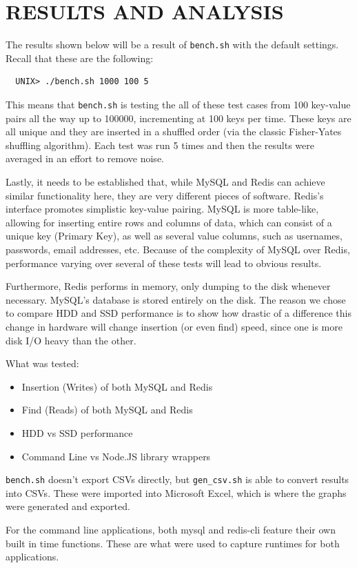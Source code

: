\documentclass[letterpaper, 10 pt, conference]{ieeeconf}
\begin{document}
\section{RESULTS AND ANALYSIS}
The results shown below will be a result of \texttt{bench.sh} with the default settings. Recall that these are the following:
\begin{verbatim}
  UNIX> ./bench.sh 1000 100 5  
\end{verbatim}
This means that \texttt{bench.sh} is testing the all of these test cases from 100 key-value pairs all the way up to 100000, incrementing at 100 keys per time. These keys are all unique and they are inserted in a shuffled order (via the classic Fisher-Yates shuffling algorithm). Each test was run 5 times and then the results were averaged in an effort to remove noise.


Lastly, it needs to be established that, while MySQL and Redis can achieve similar functionality here, they are very different pieces of software. Redis's interface promotes simplistic key-value pairing. MySQL is more table-like, allowing for inserting entire rows and columns of data, which can consist of a unique key (Primary Key), as well as several value columns, such as usernames, passwords, email addresses, etc. Because of the complexity of MySQL over Redis, performance varying over several of these tests will lead to obvious results.


Furthermore, Redis performs in memory, only dumping to the disk whenever necessary. MySQL's database is stored entirely on the disk. The reason we chose to compare HDD and SSD performance is to show how drastic of a difference this change in hardware will change insertion (or even find) speed, since one is more disk I/O heavy than the other.


What was tested:
\begin{itemize}
    \item Insertion (Writes) of both MySQL and Redis
    \item Find (Reads) of both MySQL and Redis
    \item HDD vs SSD performance
    \item Command Line vs Node.JS library wrappers
\end{itemize}
\texttt{bench.sh} doesn't export CSVs directly, but \texttt{gen\_csv.sh} is able to convert results into CSVs. These were imported into Microsoft Excel, which is where the graphs were generated and exported.


For the command line applications, both mysql and redis-cli feature their own built in time functions. These are what were used to capture runtimes for both applications.
\end{document}
